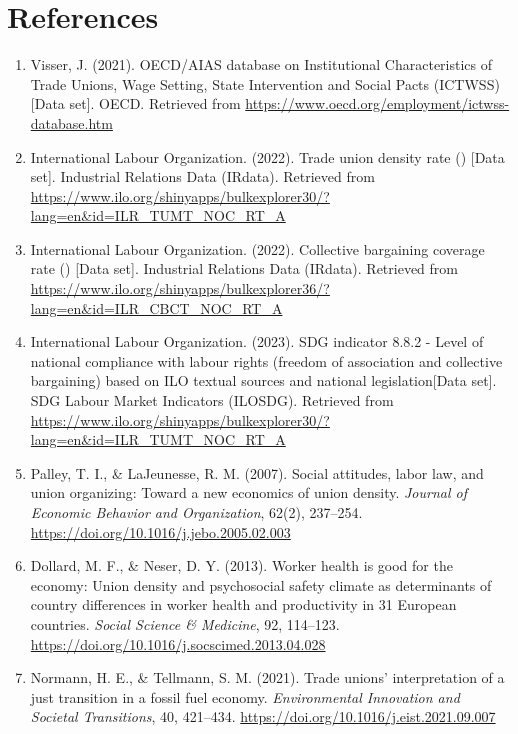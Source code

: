 \documentclass[11pt]{article}\usepackage[]{graphicx}\usepackage[]{xcolor}
\begin{document}
\section*{References}
\begin{enumerate}
  \item Visser, J. (2021). OECD/AIAS database on Institutional Characteristics of Trade Unions, Wage Setting, State Intervention and Social Pacts (ICTWSS) [Data set]. OECD. Retrieved from \url{https://www.oecd.org/employment/ictwss-database.htm}
  
  \item International Labour Organization. (2022). Trade union density rate () [Data set]. Industrial Relations Data (IRdata). Retrieved from \url{https://www.ilo.org/shinyapps/bulkexplorer30/?lang=en\&id=ILR\_TUMT\_NOC\_RT\_A}
  
  \item International Labour Organization. (2022). Collective bargaining coverage rate () [Data set]. Industrial Relations Data (IRdata). Retrieved from \url{https://www.ilo.org/shinyapps/bulkexplorer36/?lang=en\&id=ILR\_CBCT\_NOC\_RT\_A}
  
  \item International Labour Organization. (2023). SDG indicator 8.8.2 - Level of national compliance with labour rights (freedom of association and collective bargaining) based on ILO textual sources and national legislation[Data set]. SDG Labour Market Indicators (ILOSDG). Retrieved from \url{https://www.ilo.org/shinyapps/bulkexplorer30/?lang=en\&id=ILR\_TUMT\_NOC\_RT\_A}
  
  \item Palley, T. I., \& LaJeunesse, R. M. (2007). Social attitudes, labor law, and union organizing: Toward a new economics of union density. \textit{Journal of Economic Behavior and Organization}, 62(2), 237–254. \url{https://doi.org/10.1016/j.jebo.2005.02.003}
  
  \item Dollard, M. F., \& Neser, D. Y. (2013). Worker health is good for the economy: Union density and psychosocial safety climate as determinants of country differences in worker health and productivity in 31 European countries. \textit{Social Science \& Medicine}, 92, 114–123. \url{https://doi.org/10.1016/j.socscimed.2013.04.028}
  
  \item Normann, H. E., \& Tellmann, S. M. (2021). Trade unions' interpretation of a just transition in a fossil fuel economy. \textit{Environmental Innovation and Societal Transitions}, 40, 421–434. \url{https://doi.org/10.1016/j.eist.2021.09.007}
  

\end{enumerate}
\end{document}
